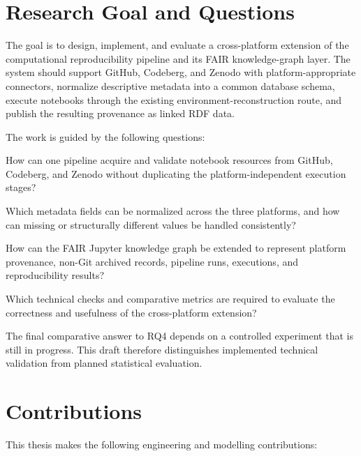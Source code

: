 \section{Research Goal and Questions}

The goal is to design, implement, and evaluate a cross-platform extension of the computational reproducibility pipeline and its FAIR knowledge-graph layer. The system should support GitHub, Codeberg, and Zenodo with platform-appropriate connectors, normalize descriptive metadata into a common database schema, execute notebooks through the existing environment-reconstruction route, and publish the resulting provenance as linked RDF data.

The work is guided by the following questions:

\begin{description}[style=nextline,leftmargin=1.5cm]
  \item[RQ1] How can one pipeline acquire and validate notebook resources from GitHub, Codeberg, and Zenodo without duplicating the platform-independent execution stages?
  \item[RQ2] Which metadata fields can be normalized across the three platforms, and how can missing or structurally different values be handled consistently?
  \item[RQ3] How can the FAIR Jupyter knowledge graph be extended to represent platform provenance, non-Git archived records, pipeline runs, executions, and reproducibility results?
  \item[RQ4] Which technical checks and comparative metrics are required to evaluate the correctness and usefulness of the cross-platform extension?
\end{description}

The final comparative answer to RQ4 depends on a controlled experiment that is still in progress. This draft therefore distinguishes implemented technical validation from planned statistical evaluation.

\section{Contributions}

This thesis makes the following engineering and modelling contributions:


